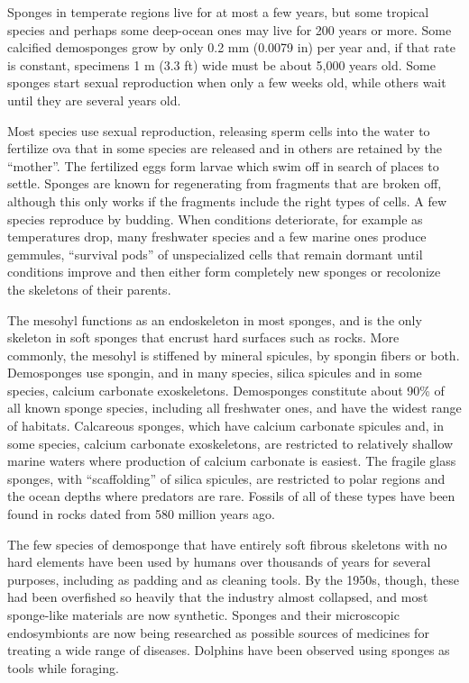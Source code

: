 \documentclass[]{book}
\begin{document}
Sponges in temperate regions live for at most a few years, but some tropical species and perhaps some deep-ocean ones may live for 200 years or more. Some calcified demosponges grow by only 0.2 mm (0.0079 in) per year and, if that rate is constant, specimens 1 m (3.3 ft) wide must be about 5,000 years old. Some sponges start sexual reproduction when only a few weeks old, while others wait until they are several years old.

Most species use sexual reproduction, releasing sperm cells into the water to fertilize ova that in some species are released and in others are retained by the ``mother''. The fertilized eggs form larvae which swim off in search of places to settle. Sponges are known for regenerating from fragments that are broken off, although this only works if the fragments include the right types of cells. A few species reproduce by budding. When conditions deteriorate, for example as temperatures drop, many freshwater species and a few marine ones produce gemmules, ``survival pods'' of unspecialized cells that remain dormant until conditions improve and then either form completely new sponges or recolonize the skeletons of their parents.

The mesohyl functions as an endoskeleton in most sponges, and is the only skeleton in soft sponges that encrust hard surfaces such as rocks. More commonly, the mesohyl is stiffened by mineral spicules, by spongin fibers or both. Demosponges use spongin, and in many species, silica spicules and in some species, calcium carbonate exoskeletons. Demosponges constitute about 90\% of all known sponge species, including all freshwater ones, and have the widest range of habitats. Calcareous sponges, which have calcium carbonate spicules and, in some species, calcium carbonate exoskeletons, are restricted to relatively shallow marine waters where production of calcium carbonate is easiest. The fragile glass sponges, with ``scaffolding'' of silica spicules, are restricted to polar regions and the ocean depths where predators are rare. Fossils of all of these types have been found in rocks dated from 580 million years ago.

The few species of demosponge that have entirely soft fibrous skeletons with no hard elements have been used by humans over thousands of years for several purposes, including as padding and as cleaning tools. By the 1950s, though, these had been overfished so heavily that the industry almost collapsed, and most sponge-like materials are now synthetic. Sponges and their microscopic endosymbionts are now being researched as possible sources of medicines for treating a wide range of diseases. Dolphins have been observed using sponges as tools while foraging.
\end{document}
